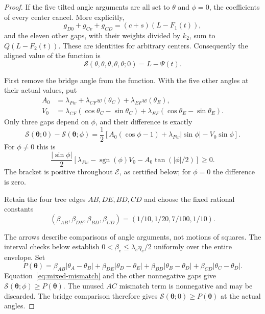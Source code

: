 \documentclass[11pt]{article}
\begin{document}
\begin{proof}
If the five tilted angle arguments are all set to $\theta$ and
$\phi=0$, the coefficients of every center cancel. More explicitly,
\[
 g_{D0}+g_{Cv}+g_{CD}=(c+s)(L-F_1(t)),
\]
and the eleven other gaps, with their weights divided by $k_2$, sum
to $Q(L-F_2(t))$. These are identities for arbitrary centers.
Consequently the aligned value of the function is
\begin{equation}
 \mathcal S(\theta,\theta,\theta,\theta,\theta;0)
 =L-\Psi(t).
 \label{eq:mixed-stress-identity}
\end{equation}

First remove the bridge angle from the function. With the five other
angles at their actual values, put
\[
 \begin{aligned}
 A_0&=\lambda_{Fw}+\lambda_{CF}w(\theta_C)
                         +\lambda_{EF}w(\theta_E),\\
 V_0&=\lambda_{CF}(\cos\theta_C-\sin\theta_C)
           +\lambda_{EF}(\cos\theta_E-\sin\theta_E).
 \end{aligned}
\]
Only three gaps depend on $\phi$, and their difference is exactly
\[
 \mathcal S(\boldsymbol\theta;0)-\mathcal S(\boldsymbol\theta;\phi)
 =\frac12\left[A_0(\cos\phi-1)+\lambda_{Fw}|\sin\phi|
                                      -V_0\sin\phi\right].
\]
For $\phi\ne0$ this is
\[
 \frac{|\sin\phi|}{2}
 \left[\lambda_{Fw}-\operatorname{sgn}(\phi)V_0
                         -A_0\tan(|\phi|/2)\right]\ge0.
\]
The bracket is positive throughout $\mathcal E$, as certified below;
for $\phi=0$ the difference is zero.

Retain the four tree edges $AB,DE,BD,CD$ and choose the fixed rational constants
\[
 (\beta_{AB},\beta_{DE},\beta_{BD},\beta_{CD})
 =(1/10,1/20,7/100,1/10).
\]
\begin{center}
\end{center}
The arrows describe comparisons of angle arguments, not motions of squares.
The interval checks below establish
$0<\beta_e\le\lambda_e\eta_e/2$ uniformly over the entire envelope. Set
\[
 P(\boldsymbol\theta)=
 \beta_{AB}|\theta_A-\theta_B|
 +\beta_{DE}|\theta_D-\theta_E|
 +\beta_{BD}|\theta_B-\theta_D|
 +\beta_{CD}|\theta_C-\theta_D|.
\]
Equation~\eqref{eq:mixed-mismatch} and the other nonnegative gaps give
$\mathcal S(\boldsymbol\theta;\phi)\ge P(\boldsymbol\theta)$.
The unused $AC$ mismatch term is nonnegative and may be discarded.
The bridge comparison therefore gives
$\mathcal S(\boldsymbol\theta;0)\ge P(\boldsymbol\theta)$
at the actual angles.


\end{proof}
\end{document}
